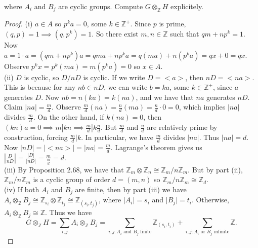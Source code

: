 \documentclass[8pt]{amsart}
\theoremstyle{plain}%
\theoremstyle{definition}
\theoremstyle{remark}
\numberwithin{equation}{section}
\newcommand{\Z}{\mathbb{Z}}
\newcommand{\D}{\displaystyle}
\begin{document}
where $A_i$ and $B_j$ are cyclic groups. Compute $G \otimes_{\Z}H$ explicitely. 
\begin{proof}
(i) $a \in A$ so $p^ka=0$, some $k \in \Z^+$. Since $p$ is prime, $(q,p)=1 \implies (q,p^k)=1$. So there exist $m,n \in \Z$ such that $qm+np^k=1$. Now $a=1\cdot a=(qm+np^k)a=qma+np^ka=q(ma)+n(p^ka)=qx+0=qx$. Observe $p^kx=p^k(ma)=m(p^ka)=0$ so $x\in A$.\\

(ii) $D$ is cyclic, so $D/nD$ is cyclic. If we write $D=<a>$, then $nD =<na>$. This is because for any $nb \in nD$, we can write $b=ka$, some $k\in \Z^+$, since $a$ generates $D$. Now $nb=n(ka)=k(na)$, and we have that $na$ generates $nD$. \\

Claim $|na|=\frac{m}{d}$. Observe $\frac{m}{d}(na)=\frac{n}{d}(ma)=\frac{n}{d}\cdot 0=0$, which implies $|na|$ divides $\frac{m}{d}$. On the other hand, if $k(na)=0$, then $(kn)a=0 \implies m|kn \implies \frac{m}{d}|k\frac{n}{d}$. But $\frac{m}{d}$ and $\frac{n}{d}$ are relatively prime by construction, forcing $\frac{m}{d}|k$. In particular, we have $\frac{m}{d}$ divides $|na|$. Thus $|na|=d$. Now $|nD|=|<na>|=|na|=\frac{m}{d}$. Lagrange's theorem gives us $|\frac{D}{nD}|=\frac{|D|}{|nD|}=\frac{m}{\frac{m}{d}}=d$. \\

(iii) By Proposition 2.68, we have that $\Z_m \otimes \Z_n \cong \Z_m/n\Z_m$. But by part (ii), $\Z_m/n\Z_m$ is a cyclic group of order $d=(m,n)$ so $\Z_m/n\Z_m \cong \Z_d$.\\

(iv) If both $A_i$ and $B_j$ are finite, then by part (iii) we have $A_i \otimes_\Z B_j \cong \Z_{s_i} \otimes \Z_{t_j} \cong \Z_{(s_i, t_j)}$, where $\vert A_i \vert = s_i$ and $\vert B_j \vert = t_i$. Otherwise, $A_i \otimes_\Z B_j \cong \Z$. Thus we have $$G \otimes_\Z H = \D \sum_{i, j} A_i \otimes_\Z B_j = \sum_{i, j : A_i \text{ and } B_j \text{ finite}} \Z_{(s_i, t_i)} + \sum_{i, j : A_i \text{ or } B_j \text{ infinite}}\Z.$$

\end{proof}
\end{document}
